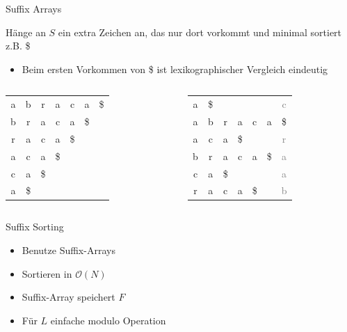 \documentclass[ngerman,aspectratio=169,10pt]{beamer}
\newcommand{\grey}[1]{\textcolor{gray}{#1}}
\begin{document}
\begin{frame}{Suffix Arrays}
    
    Hänge an $S$ ein extra Zeichen an, das nur dort vorkommt und minimal sortiert z.B. \$ 
    
    \begin{itemize}
        \item Beim ersten Vorkommen von \$ ist lexikographischer Vergleich eindeutig
    \end{itemize}
    
    \begin{columns}
	    \begin{column}{0.46\textwidth}
	        \begin{tabular}{ccccccc}
	            a&b&r&a&c&a&\$\\
	            b&r&a&c&a&\$&\\
	            r&a&c&a&\$&&\\
	            a&c&a&\$&&&\\
	            c&a&\$&&&&\\
	            a&\$&&&&&\\
	        \end{tabular}
	    \end{column}
	    \begin{column}{0.46\textwidth}
	        \begin{tabular}{ccccccc}
	            a&\$&&&&&\grey{c}\\
	            a&b&r&a&c&a&\$\\
	            a&c&a&\$&&&\grey{r}\\
	            b&r&a&c&a&\$&\grey{a}\\
	            c&a&\$&&&&\grey{a}\\
	            r&a&c&a&\$&&\grey{b}\\
	        \end{tabular}
	    \end{column}
    \end{columns}
\end{frame}

\begin{frame}{Suffix Sorting}
    \begin{itemize}
        \item Benutze Suffix-Arrays
        \item Sortieren in $\mathcal{O}(N)$
        \item Suffix-Array speichert $F$
        \item Für $L$ einfache modulo Operation
    \end{itemize}
\end{frame}
\end{document}
